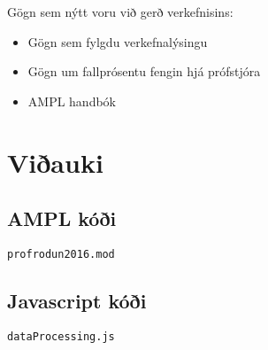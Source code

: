 \documentclass[12pt]{article}
\begin{document}
Gögn sem nýtt voru við gerð verkefnisins:
\begin{itemize}
	\item Gögn sem fylgdu verkefnalýsingu
	\item Gögn um fallprósentu fengin hjá prófstjóra
	\item AMPL handbók
\end{itemize}

\newpage

\section{Viðauki}

\subsection{AMPL kóði}

\texttt{profrodun2016.mod}


\subsection{Javascript kóði}

\texttt{dataProcessing.js}

\end{document}
